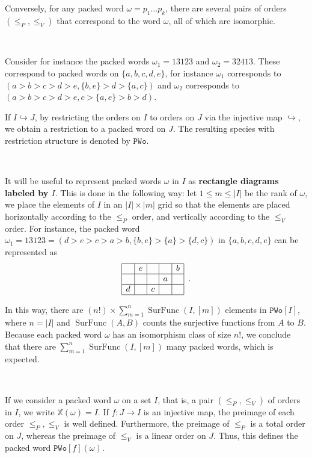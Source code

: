 \documentclass[12pt, reqno]{amsart}
\theoremstyle{definition}
\DeclareMathOperator{\sFunc}{\mathrm{SurFunc}}
\begin{document}
Conversely, for any packed word $\omega = p_1\dots p_k$, there are several pairs of orders $(\leq_P, \leq_V)$ that correspond to the word $\omega $, all of which are isomorphic.

\

Consider for instance the packed words $\omega_1 = 13123$ and $\omega_2 = 32413$.
These correspond to packed words on $\{a, b, c, d, e\}$, for instance $\omega_1$ corresponds to $(a > b > c > d > e, \{b, e\} > d > \{a, c\})$ and $\omega_2$ corresponds to $(a > b > c > d > e, c > \{a, e\} >  b > d)$.


If $I \hookrightarrow J$, by restricting the orders on $I$ to orders on $J$ via the injective map $\hookrightarrow $, we obtain a restriction to a packed word on $J$.
The resulting species with restriction structure is denoted by $\mathtt{PWo}$.

\

It will be useful to represent packed words $\omega $ in $I$ as \textbf{rectangle diagrams labeled by $I$}.
This is done in the following way: let $1\leq m \leq |I|$ be the rank of $\omega$, we place the elements of $I$ in an $|I| \times |m|$ grid so that the elements are placed horizontally according to the $\leq_P$ order, and vertically according to the $\leq_V$ order.
For instance, the packed word $\omega_1 = 13123 = ( d > e > c > a > b, \{b, e\} > \{a\} > \{d, c\})$ in $\{a, b, c, d, e\}$ can be represented as 
\begin{equation}
\begin{array}{|c|c|c|c|c|}
	\hline   & e &   &   & b \\
    \hline   &   &   & a &   \\
    \hline d &   & c &   &   \\
    \hline 
\end{array}\, \, \, .
\end{equation}




In this way, there are $(n!) \times \sum_{m = 1}^n \sFunc(I, [m])$ elements in $\mathtt{PWo}[I]$, where $n = |I|$ and $\sFunc(A, B)$ counts the surjective functions from $A$ to $B$.
Because each packed word $\omega $ has an isomorphism class of size $n!$, we conclude that there are $ \sum_{m = 1}^n \sFunc(I, [m])$ many packed words, which is expected.

\

\label{defin:pwo}
If we consider a packed word $\omega$ on a set $I$, that is, a pair $(\leq_P, \leq_V) $ of orders in $I$, we write $\mathbb{X}(\omega) = I$.
If $f:J \to I $ is an injective map, the preimage of each order $\leq_P, \leq_V$ is well defined.
Furthermore, the preimage of $\leq_P$ is a total order on $J$, whereas the preimage of $\leq_V$ is a linear order on $J$.
Thus, this defines the packed word $\mathtt{PWo}[f](\omega )$.
\end{document}
